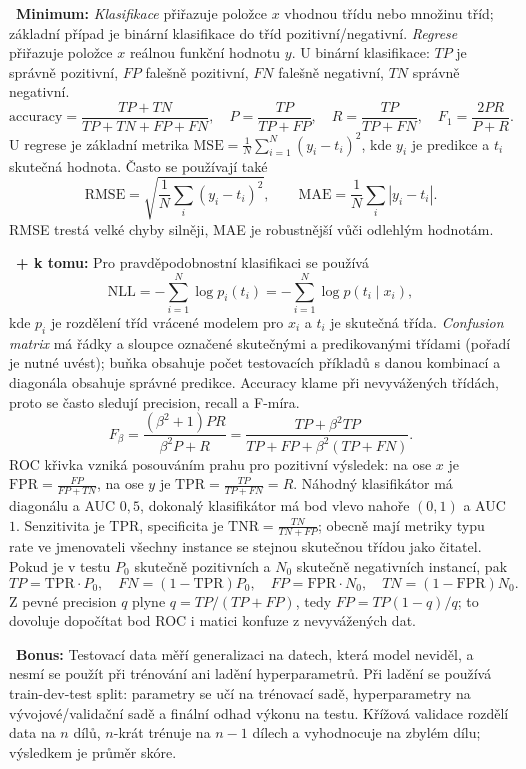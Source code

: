 \begin{odpoved}
\setlength{\parskip}{2pt}
\noindent{}\ \textbf{Minimum:} \emph{Klasifikace} přiřazuje položce $x$ vhodnou třídu nebo množinu tříd; základní případ je binární klasifikace do tříd pozitivní/negativní. \emph{Regrese} přiřazuje položce $x$ reálnou funkční hodnotu $y$.
U binární klasifikace: $TP$ je správně pozitivní, $FP$ falešně pozitivní, $FN$ falešně negativní, $TN$ správně negativní.
\[
\mathrm{accuracy}=\frac{TP+TN}{TP+TN+FP+FN},\quad
P=\frac{TP}{TP+FP},\quad
R=\frac{TP}{TP+FN},\quad
F_1=\frac{2PR}{P+R}.
\]
U regrese je základní metrika $\mathrm{MSE}=\frac1N\sum_{i=1}^N(y_i-t_i)^2$, kde $y_i$ je predikce a $t_i$ skutečná hodnota. Často se používají také
\[
\mathrm{RMSE}=\sqrt{\frac1N\sum_i(y_i-t_i)^2},\qquad
\mathrm{MAE}=\frac1N\sum_i|y_i-t_i|.
\]
RMSE trestá velké chyby silněji, MAE je robustnější vůči odlehlým hodnotám.\par
\noindent{}\ \textbf{+ k tomu:} Pro pravděpodobnostní klasifikaci se používá
\[
\mathrm{NLL}=-\sum_{i=1}^N\log p_i(t_i)=-\sum_{i=1}^N\log p(t_i\mid x_i),
\]
kde $p_i$ je rozdělení tříd vrácené modelem pro $x_i$ a $t_i$ je skutečná třída. \emph{Confusion matrix} má řádky a sloupce označené skutečnými a predikovanými třídami (pořadí je nutné uvést); buňka obsahuje počet testovacích příkladů s danou kombinací a diagonála obsahuje správné predikce. Accuracy klame při nevyvážených třídách, proto se často sledují precision, recall a F-míra.
\[
F_\beta=\frac{(\beta^2+1)PR}{\beta^2P+R}
=\frac{TP+\beta^2TP}{TP+FP+\beta^2(TP+FN)}.
\]
ROC křivka vzniká posouváním prahu pro pozitivní výsledek: na ose $x$ je $\mathrm{FPR}=\frac{FP}{FP+TN}$, na ose $y$ je $\mathrm{TPR}=\frac{TP}{TP+FN}=R$. Náhodný klasifikátor má diagonálu a AUC $0{,}5$, dokonalý klasifikátor má bod vlevo nahoře $(0,1)$ a AUC $1$. Senzitivita je TPR, specificita je $\mathrm{TNR}=\frac{TN}{TN+FP}$; obecně mají metriky typu rate ve jmenovateli všechny instance se stejnou skutečnou třídou jako čitatel. Pokud je v testu $P_0$ skutečně pozitivních a $N_0$ skutečně negativních instancí, pak
\[
TP=\mathrm{TPR}\cdot P_0,\quad FN=(1-\mathrm{TPR})P_0,\quad
FP=\mathrm{FPR}\cdot N_0,\quad TN=(1-\mathrm{FPR})N_0.
\]
Z pevné precision $q$ plyne $q=TP/(TP+FP)$, tedy $FP=TP(1-q)/q$; to dovoluje dopočítat bod ROC i matici konfuze z nevyvážených dat.\par
\noindent{}\ \textbf{Bonus:} Testovací data měří generalizaci na datech, která model neviděl, a nesmí se použít při trénování ani ladění hyperparametrů. Při ladění se používá train-dev-test split: parametry se učí na trénovací sadě, hyperparametry na vývojové/validační sadě a finální odhad výkonu na testu. Křížová validace rozdělí data na $n$ dílů, $n$-krát trénuje na $n-1$ dílech a vyhodnocuje na zbylém dílu; výsledkem je průměr skóre.

\end{odpoved}
